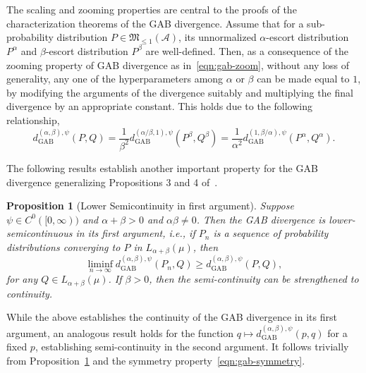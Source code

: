 \documentclass[11pt]{article}
\theoremstyle{plain}
\newtheorem{proposition}{Proposition}
\theoremstyle{remark}
\newcommand{\Acal}{\mathcal{A}}
\newcommand{\Mfrak}{\mathfrak{M}}
\newcommand{\dGAB}{d_{\mathrm{GAB}}}
\begin{document}
The scaling and zooming properties are central to the proofs of the characterization theorems of the GAB divergence. Assume that for a sub-probability distribution $P \in \Mfrak_{\leq 1}(\Acal)$, its unnormalized $\alpha$-escort distribution $P^{\alpha}$ and $\beta$-escort distribution $P^{\beta}$ are well-defined. Then, as a consequence of the zooming property of GAB divergence as in~\eqref{eqn:gab-zoom}, without any loss of generality, any one of the hyperparameters among $\alpha$ or $\beta$ can be made equal to $1$, by modifying the arguments of the divergence suitably and multiplying the final divergence by an appropriate constant. This holds due to the following relationship,
\begin{equation}
    \dGAB^{(\alpha,\beta),\psi}(P, Q)
    = \dfrac{1}{\beta^2} \dGAB^{(\alpha/\beta,1),\psi}(P^\beta, Q^\beta)
    = \dfrac{1}{\alpha^2}\dGAB^{(1,\beta/\alpha),\psi}(P^\alpha, Q^\alpha).
    \label{eqn:gab-reduction-to-1}
\end{equation}

The following results establish another important property for the GAB divergence generalizing Propositions 3 and 4 of~\cite{kumar2015minimization}.

\begin{proposition}[Lower Semicontinuity in first argument]\label{thm:gab-semicont}
    Suppose $\psi \in C^0([0, \infty))$ and $\alpha + \beta > 0$ and $\alpha\beta \neq 0$. Then the GAB divergence is lower-semicontinuous in its first argument, i.e., if $P_n$ is a sequence of probability distributions converging to $P$ in $L_{\alpha+\beta}(\mu)$, then
    \begin{equation}
        \liminf_{n\rightarrow \infty} \dGAB^{(\alpha,\beta),\psi}(P_n, Q) \geq \dGAB^{(\alpha,\beta),\psi}(P, Q),
        \label{eqn:liminf-gab-div}
    \end{equation}
    \noindent for any $Q \in L_{\alpha+\beta}(\mu)$. If $\beta > 0$, then the semi-continuity can be strengthened to continuity.
\end{proposition}
\noindent While the above establishes the continuity of the GAB divergence in its first argument, an analogous result holds for the function $q \mapsto \dGAB^{(\alpha,\beta),\psi}(p, q)$ for a fixed $p$, establishing semi-continuity in the second argument. It follows trivially from Proposition~\ref{thm:gab-semicont} and the symmetry property~\eqref{eqn:gab-symmetry}.
\end{document}
